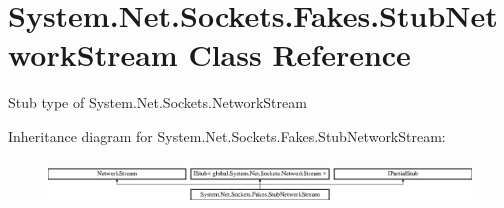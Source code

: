 \hypertarget{class_system_1_1_net_1_1_sockets_1_1_fakes_1_1_stub_network_stream}{\section{System.\-Net.\-Sockets.\-Fakes.\-Stub\-Network\-Stream Class Reference}
\label{class_system_1_1_net_1_1_sockets_1_1_fakes_1_1_stub_network_stream}
}


Stub type of System.\-Net.\-Sockets.\-Network\-Stream 


Inheritance diagram for System.\-Net.\-Sockets.\-Fakes.\-Stub\-Network\-Stream\-:\begin{figure}[H]
\begin{center}
\leavevmode
\includegraphics[height=1.204301cm]{class_system_1_1_net_1_1_sockets_1_1_fakes_1_1_stub_network_stream}
\end{center}
\end{figure}
